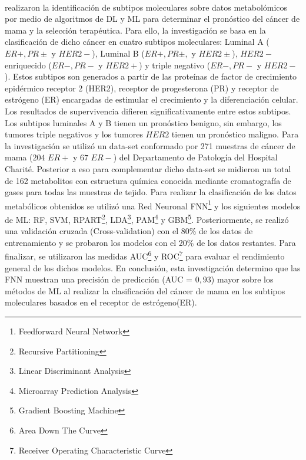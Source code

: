 \\
\cite{Alakwaa2018} realizaron la identificación de subtipos moleculares sobre datos metabolómicos por medio de algoritmos de DL y ML para determinar el pronóstico del cáncer de mama y la selección terapéutica. Para ello, la investigación se basa en la clasificación de dicho cáncer en cuatro subtipos moleculares: Luminal A ($ER +, PR \pm$ y $HER2-$), Luminal B ($ER +, PR \pm,$ y $HER2\pm$), $HER2-$ enriquecido ($ER-, PR-$ y $HER2 +$) y triple negativo ($ER-, PR-$ y $HER2 -$). Estos subtipos son generados a partir de las proteínas de factor de crecimiento epidérmico receptor 2 (HER2), receptor de progesterona (PR) y receptor de estrógeno (ER) encargadas de estimular el crecimiento y la diferenciación celular. Los resultados de supervivencia difieren significativamente entre estos subtipos. Los subtipos luminales A y B tienen un pronóstico benigno, sin embargo, los tumores triple negativos y los tumores $HER2$ tienen un pronóstico maligno. Para la investigación se utilizó un data-set conformado por 271 muestras de cáncer de mama ($204$ $ER+ $ y $67$ $ER- $) del Departamento de Patología del Hospital Charité. Posterior a eso para complementar dicho data-set se midieron un total de 162 metabolitos con estructura química conocida mediante cromatografía de gases para todas las muestras de tejido. Para realizar la clasificación de los datos metabólicos obtenidos se utilizó una Red Neuronal FNN\footnote{Feedforward Neural Network} y los siguientes modelos de ML: RF, SVM, RPART\footnote{Recursive Partitioning}, LDA\footnote{Linear Discriminant Analysis}, PAM\footnote{Microarray Prediction Analysis} y GBM\footnote{Gradient Boosting Machine}. Posteriormente, se realizó una validación cruzada (Cross-validation) con el 80\% de los datos de entrenamiento y se probaron los modelos con el 20\% de los datos restantes. Para finalizar, se utilizaron las medidas AUC\footnote{Area Down The Curve} y ROC\footnote{Receiver Operating Characteristic Curve} para evaluar el rendimiento general de los dichos modelos. En conclusión, esta investigación determino que las FNN muestran una precisión de predicción (AUC = $0,93$) mayor sobre los métodos de ML al realizar la clasificación del cáncer de mama en los subtipos moleculares basados en el receptor de estrógeno(ER).

